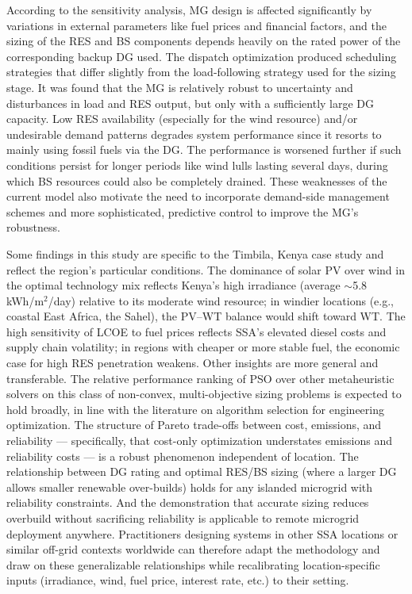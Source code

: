 \documentclass[final,3p,times]{elsarticle}
\begin{document}
According to the sensitivity analysis, MG design is affected significantly by variations in external parameters like fuel prices and financial factors, and the sizing of the RES and BS components depends heavily on the rated power of the corresponding backup DG used. The dispatch optimization produced scheduling strategies that differ slightly from the load-following strategy used for the sizing stage. It was found that the MG is relatively robust to uncertainty and disturbances in load and RES output, but only with a sufficiently large DG capacity. Low RES availability (especially for the wind resource) and/or undesirable demand patterns degrades system performance since it resorts to mainly using fossil fuels via the DG. The performance is worsened further if such conditions persist for longer periods like wind lulls lasting several days, during which BS resources could also be completely drained. These weaknesses of the current model also motivate the need to incorporate demand-side management schemes and more sophisticated, predictive control to improve the MG's robustness.

Some findings in this study are specific to the Timbila, Kenya case study and reflect the region's particular conditions. The dominance of solar PV over wind in the optimal technology mix reflects Kenya's high irradiance (average $\sim$5.8 kWh/m$^2$/day) relative to its moderate wind resource; in windier locations (e.g., coastal East Africa, the Sahel), the PV--WT balance would shift toward WT. The high sensitivity of LCOE to fuel prices reflects SSA's elevated diesel costs and supply chain volatility; in regions with cheaper or more stable fuel, the economic case for high RES penetration weakens. Other insights are more general and transferable. The relative performance ranking of PSO over other metaheuristic solvers on this class of non-convex, multi-objective sizing problems is expected to hold broadly, in line with the literature on algorithm selection for engineering optimization. The structure of Pareto trade-offs between cost, emissions, and reliability --- specifically, that cost-only optimization understates emissions and reliability costs --- is a robust phenomenon independent of location. The relationship between DG rating and optimal RES/BS sizing (where a larger DG allows smaller renewable over-builds) holds for any islanded microgrid with reliability constraints. And the demonstration that accurate sizing reduces overbuild without sacrificing reliability is applicable to remote microgrid deployment anywhere. Practitioners designing systems in other SSA locations or similar off-grid contexts worldwide can therefore adapt the methodology and draw on these generalizable relationships while recalibrating location-specific inputs (irradiance, wind, fuel price, interest rate, etc.) to their setting.
\end{document}
